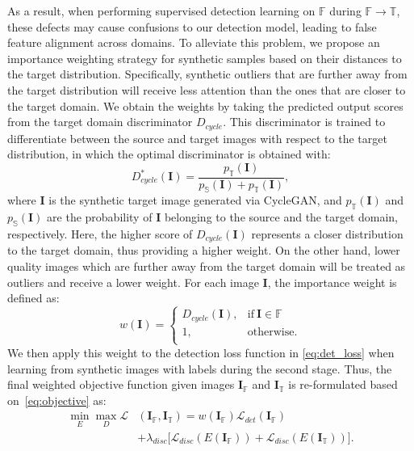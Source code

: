 \documentclass[10pt,twocolumn,letterpaper]{article}
\begin{document}
As a result, when performing supervised detection learning on $\mathbb{F}$ during $\mathbb{F} \rightarrow \mathbb{T}$, these defects may cause confusions to our detection model, leading to false feature alignment across domains.
To alleviate this problem, we propose an importance weighting strategy for synthetic samples based on their distances to the target distribution.
Specifically, synthetic outliers that are further away from the target distribution will receive less attention than the ones that are closer to the target domain.
We obtain the weights by taking the predicted output scores from the target domain discriminator $D_{cycle}$.
This discriminator is trained to differentiate between the source and target images with respect to the target distribution, in which the optimal discriminator is obtained with:
\begin{equation}
D^*_{cycle}(\mathbf{I}) = \frac{p_{\mathbb{T}}(\mathbf{I})}{p_{\mathbb{S}}(\mathbf{I})+p_{\mathbb{T}}(\mathbf{I})},
\end{equation}
where $\mathbf{I}$ is the synthetic target image generated via CycleGAN, and $p_{\mathbb{T}}(\mathbf{I})$ and $p_{\mathbb{S}}(\mathbf{I})$ are the probability of $\mathbf{I}$ belonging to the source and the target domain, respectively.
Here, the higher score of $D_{cycle}(\mathbf{I})$ represents a closer distribution to the target domain, thus providing a higher weight.
On the other hand, lower quality images which are further away from the target domain will be treated as outliers and receive a lower weight.
For each image $\mathbf{I}$, the importance weight is defined as:
\begin{equation}
w(\mathbf{I}) = \left\{
\begin{array}{cc}
      D_{cycle}(\mathbf{I}), & \mbox{if} \ \mathbf{I} \in \mathbb{F} \\
      1, & \mbox{otherwise.}\\
\end{array} 
\right. 
\end{equation}
We then apply this weight to the detection loss function in \eqref{eq:det_loss} when learning from synthetic images with labels during the second stage.
Thus, the final weighted objective function given images $\mathbf{I}_{\mathbb{F}}$ and $\mathbf{I}_{\mathbb{T}}$ is re-formulated based on~\eqref{eq:objective} as:
\begin{align}
  \min_{E} \max_{D} \mathcal{L}&(\mathbf{I}_\mathbb{F}, \mathbf{I}_\mathbb{T}) = w(\mathbf{I}_\mathbb{F})\mathcal{L}_{det}(\mathbf{I}_\mathbb{F}) \nonumber \\
 & + \lambda_{disc} \big[ \mathcal{L}_{disc}(E(\mathbf{I}_\mathbb{F})) + \mathcal{L}_{disc}(E(\mathbf{I}_\mathbb{T})) \big].
\end{align}
\end{document}
